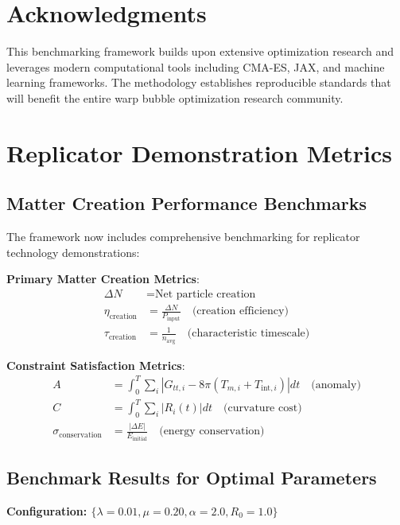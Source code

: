 \documentclass[11pt,a4paper]{article}
\begin{document}
\section*{Acknowledgments}

This benchmarking framework builds upon extensive optimization research and leverages modern computational tools including CMA-ES, JAX, and machine learning frameworks. The methodology establishes reproducible standards that will benefit the entire warp bubble optimization research community.

\section{Replicator Demonstration Metrics}

\subsection{Matter Creation Performance Benchmarks}

The framework now includes comprehensive benchmarking for replicator technology demonstrations:

\textbf{Primary Matter Creation Metrics}:
\begin{align}
\Delta N &= \text{Net particle creation} \\
\eta_{\text{creation}} &= \frac{\Delta N}{P_{\text{input}}} \quad \text{(creation efficiency)} \\
\tau_{\text{creation}} &= \frac{1}{\dot{n}_{\text{avg}}} \quad \text{(characteristic timescale)}
\end{align}

\textbf{Constraint Satisfaction Metrics}:
\begin{align}
A &= \int_0^T \sum_i |G_{tt,i} - 8\pi(T_{m,i} + T_{\text{int},i})| dt \quad \text{(anomaly)} \\
C &= \int_0^T \sum_i |R_i(t)| dt \quad \text{(curvature cost)} \\
\sigma_{\text{conservation}} &= \frac{|\Delta E|}{E_{\text{initial}}} \quad \text{(energy conservation)}
\end{align}

\subsection{Benchmark Results for Optimal Parameters}

\textbf{Configuration: $\{\lambda=0.01, \mu=0.20, \alpha=2.0, R_0=1.0\}$}
\end{document}
